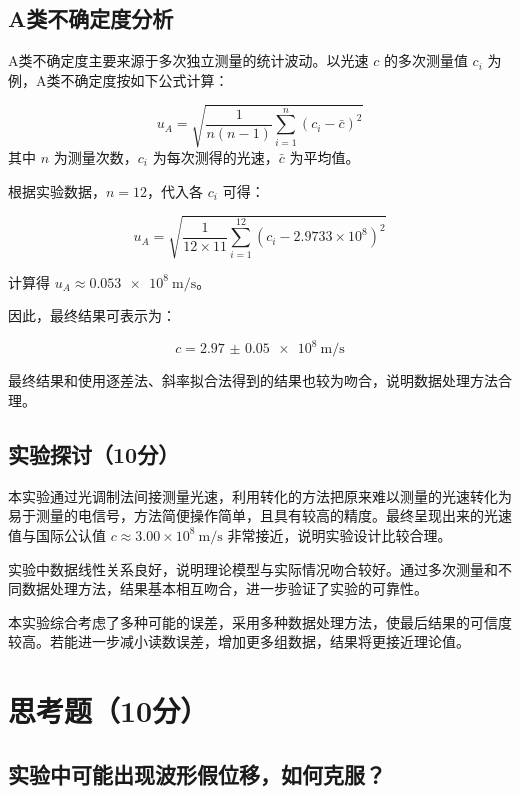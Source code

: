 \documentclass[]{../../templates/Report}%
\begin{document}
\subsection{A类不确定度分析}

A类不确定度主要来源于多次独立测量的统计波动。以光速 $c$ 的多次测量值 $c_i$ 为例，A类不确定度按如下公式计算：

\begin{equation}
    u_A = \sqrt{\frac{1}{n(n-1)} \sum_{i=1}^n (c_i - \bar{c})^2}
\end{equation}
其中 $n$ 为测量次数，$c_i$ 为每次测得的光速，$\bar{c}$ 为平均值。

根据实验数据，$n=12$，代入各 $c_i$ 可得：

\begin{equation}
    u_A = \sqrt{\frac{1}{12 \times 11} \sum_{i=1}^{12} (c_i - 2.9733 \times 10^8)^2}
\end{equation}

计算得 $ u_A \approx \SI{0.053e8}{\meter\per\second}$。

因此，最终结果可表示为：

\begin{equation}
    c = \SI{2.97(5)e8}{\meter\per\second}
\end{equation}

最终结果和使用逐差法、斜率拟合法得到的结果也较为吻合，说明数据处理方法合理。

\subsection{实验探讨（10分）}
本实验通过光调制法间接测量光速，利用转化的方法把原来难以测量的光速转化为易于测量的电信号，方法简便操作简单，且具有较高的精度。最终呈现出来的光速值与国际公认值 $c \approx 3.00 \times 10^8\ \mathrm{m/s}$ 非常接近，说明实验设计比较合理。

实验中数据线性关系良好，说明理论模型与实际情况吻合较好。通过多次测量和不同数据处理方法，结果基本相互吻合，进一步验证了实验的可靠性。

本实验综合考虑了多种可能的误差，采用多种数据处理方法，使最后结果的可信度较高。若能进一步减小读数误差，增加更多组数据，结果将更接近理论值。


\newpage
\section{思考题（10分）}
\subsection{实验中可能出现波形假位移，如何克服？}
\end{document}

